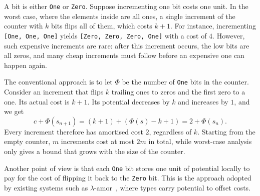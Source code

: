 \noindent
A bit is either \texttt{One} or \texttt{Zero}.
Suppose incrementing one bit costs one unit. In the worst case, where the elements inside are all ones, a single
increment of the counter with $k$ bits flips all of them, which costs $k + 1$.
For instance, incrementing \texttt{[One, One, One]} yields
\texttt{[Zero, Zero, Zero, One]} with a cost of $4$. However, such expensive
increments are rare: after this increment occurs, the low bits are all zeros, and many
cheap increments must follow before an expensive one can happen again.

The conventional approach is to let $\Phi$ be the number of
\texttt{One} bits in the counter. Consider an increment that flips $k$
trailing ones to zeros and the first zero to a
one. Its actual cost is $k + 1$. Its potential decreases by $k$ and
increases by $1$, and we get
\[
  c + \Phi(s_{n+1}) = (k + 1) + (\Phi(s) -  k + 1) = 2 + \Phi(s_{n}).
\]
Every increment therefore has amortised cost $2$, regardless of $k$. 
Starting from the empty counter, $m$ increments cost at most
$2m$ in total, while worst-case analysis only gives a bound that grows
with the size of the counter.

Another point of view is that 
each \texttt{One} bit stores one unit of potential locally to pay for the cost of flipping it back to
the \texttt{Zero} bit. This is the approach adopted by existing systems such as $\lambda$-amor~\citep{rajaniUnifyingTypetheoryHigherorder2021a}, where types carry potential to offset costs.




